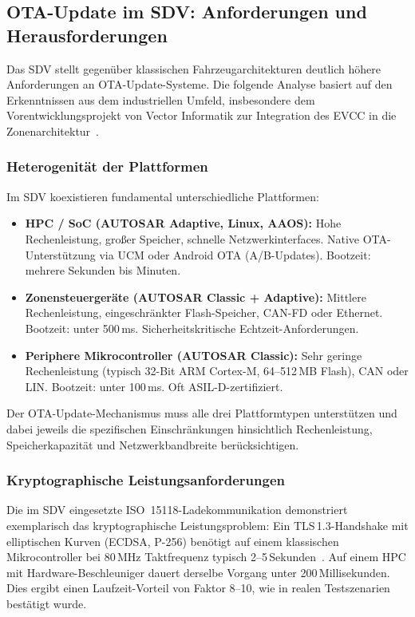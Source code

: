 ﻿\documentclass[12pt,a4paper,twoside]{article}
\begin{document}
\subsection{OTA-Update im SDV: Anforderungen und Herausforderungen}
\label{subsec:ota_sdv_anforderungen}

Das SDV stellt gegenüber klassischen Fahrzeugarchitekturen deutlich höhere
Anforderungen an OTA-Update-Systeme. Die folgende Analyse basiert auf den
Erkenntnissen aus dem industriellen Umfeld, insbesondere dem Vorentwicklungsprojekt
von Vector Informatik zur Integration des EVCC in die Zonenarchitektur~\cite{schneider2026ladekomm}.

\subsubsection{Heterogenität der Plattformen}

Im SDV koexistieren fundamental unterschiedliche Plattformen:

\begin{itemize}
  \item \textbf{HPC / SoC (AUTOSAR Adaptive, Linux, AAOS):} Hohe Rechenleistung,
    großer Speicher, schnelle Netzwerkinterfaces. Native OTA-Unterstützung via UCM
    oder Android OTA (A/B-Updates). Bootzeit: mehrere Sekunden bis Minuten.
  \item \textbf{Zonensteuergeräte (AUTOSAR Classic + Adaptive):} Mittlere
    Rechenleistung, eingeschränkter Flash-Speicher, CAN-FD oder Ethernet.
    Bootzeit: unter 500\,ms. Sicherheitskritische Echtzeit-Anforderungen.
  \item \textbf{Periphere Mikrocontroller (AUTOSAR Classic):} Sehr geringe
    Rechenleistung (typisch 32-Bit ARM Cortex-M, 64--512\,MB Flash), CAN oder LIN.
    Bootzeit: unter 100\,ms. Oft ASIL-D-zertifiziert.
\end{itemize}

Der OTA-Update-Mechanismus muss alle drei Plattformtypen unterstützen und dabei
jeweils die spezifischen Einschränkungen hinsichtlich Rechenleistung,
Speicherkapazität und Netzwerkbandbreite berücksichtigen.

\subsubsection{Kryptographische Leistungsanforderungen}

Die im SDV eingesetzte ISO~15118-Ladekommunikation demonstriert exemplarisch
das kryptographische Leistungsproblem: Ein TLS\,1.3-Handshake mit elliptischen
Kurven (ECDSA, P-256) benötigt auf einem klassischen Mikrocontroller bei
80\,MHz Taktfrequenz typisch 2--5\,Sekunden~\cite{schneider2026ladekomm}.
Auf einem HPC mit Hardware-Beschleuniger dauert derselbe Vorgang unter
200\,Millisekunden. Dies ergibt einen Laufzeit-Vorteil von Faktor 8--10,
wie in realen Testszenarien bestätigt wurde.
\end{document}
